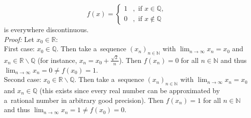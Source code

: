\begin{example}
\begin{enumerate}[a)]
\[f(x)=\begin{cases}1&,\text{ if }x\in\mathbb{Q},\\0&,\text{ if }x\notin\mathbb{Q}\end{cases}\]
 is everywhere discontinuous.\\
       \whiteskipsmall
{\em Proof:} Let $x_0\in\mathbb{R}$:\\
First case: $x_0\in\mathbb{Q}$. Then take a~sequence $(x_n)_{n\in\mathbb{N}}$ with $\lim_{n\to \infty}x_n=x_0$ and $x_n\in\mathbb{R}\backslash\mathbb{Q}$ (for instance, $x_n=x_0+\frac{\sqrt{2}}{n}$). Then $f(x_n)=0$ for all $n\in\mathbb{N}$ and thus $\lim_{n\to \infty}x_n=0\neq f(x_0)=1$.\\
Second case: $x_0\in\mathbb{R}\backslash\mathbb{Q}$. Then take a~sequence $(x_n)_{n\in\mathbb{N}}$ with $\lim_{n\to \infty}x_n=x_0$ and $x_n\in\mathbb{Q}$ (this exists since every real number can be approximated by a~rational number in arbitrary good precision). Then $f(x_n)=1$ for all $n\in\mathbb{N}$ and thus $\lim_{n\to \infty}x_n=1\neq f(x_0)=0$.
\end{enumerate}
\end{example}

